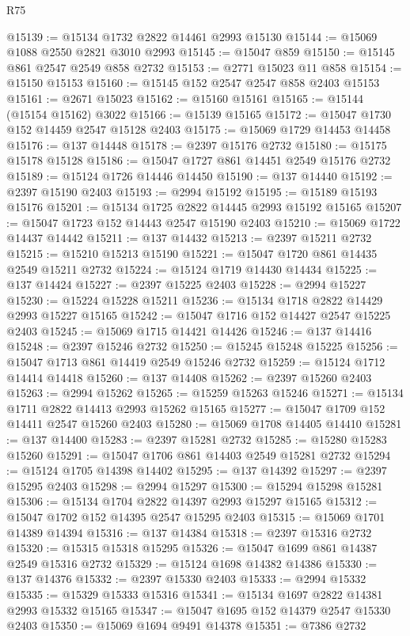 \begin{lexlean}{R75}
\begin{coremodule}
@15139 := @15134 @1732 @2822 @14461 @2993 @15130
@15144 := @15069 @1088 @2550 @2821 @3010 @2993
@15145 := @15047 @859
@15150 := @15145 @861 @2547 @2549 @858 @2732
@15153 := @2771 @15023 @11 @858
@15154 := @15150 @15153
@15160 := @15145 @152 @2547 @2547 @858 @2403 @15153
@15161 := @2671 @15023
@15162 := @15160 @15161
@15165 := @15144 (@15154 @15162) @3022
@15166 := @15139 @15165
@15172 := @15047 @1730 @152 @14459 @2547 @15128 @2403
@15175 := @15069 @1729 @14453 @14458
@15176 := @137 @14448
@15178 := @2397 @15176 @2732
@15180 := @15175 @15178 @15128
@15186 := @15047 @1727 @861 @14451 @2549 @15176 @2732
@15189 := @15124 @1726 @14446 @14450
@15190 := @137 @14440
@15192 := @2397 @15190 @2403
@15193 := @2994 @15192
@15195 := @15189 @15193 @15176
@15201 := @15134 @1725 @2822 @14445 @2993 @15192 @15165
@15207 := @15047 @1723 @152 @14443 @2547 @15190 @2403
@15210 := @15069 @1722 @14437 @14442
@15211 := @137 @14432
@15213 := @2397 @15211 @2732
@15215 := @15210 @15213 @15190
@15221 := @15047 @1720 @861 @14435 @2549 @15211 @2732
@15224 := @15124 @1719 @14430 @14434
@15225 := @137 @14424
@15227 := @2397 @15225 @2403
@15228 := @2994 @15227
@15230 := @15224 @15228 @15211
@15236 := @15134 @1718 @2822 @14429 @2993 @15227 @15165
@15242 := @15047 @1716 @152 @14427 @2547 @15225 @2403
@15245 := @15069 @1715 @14421 @14426
@15246 := @137 @14416
@15248 := @2397 @15246 @2732
@15250 := @15245 @15248 @15225
@15256 := @15047 @1713 @861 @14419 @2549 @15246 @2732
@15259 := @15124 @1712 @14414 @14418
@15260 := @137 @14408
@15262 := @2397 @15260 @2403
@15263 := @2994 @15262
@15265 := @15259 @15263 @15246
@15271 := @15134 @1711 @2822 @14413 @2993 @15262 @15165
@15277 := @15047 @1709 @152 @14411 @2547 @15260 @2403
@15280 := @15069 @1708 @14405 @14410
@15281 := @137 @14400
@15283 := @2397 @15281 @2732
@15285 := @15280 @15283 @15260
@15291 := @15047 @1706 @861 @14403 @2549 @15281 @2732
@15294 := @15124 @1705 @14398 @14402
@15295 := @137 @14392
@15297 := @2397 @15295 @2403
@15298 := @2994 @15297
@15300 := @15294 @15298 @15281
@15306 := @15134 @1704 @2822 @14397 @2993 @15297 @15165
@15312 := @15047 @1702 @152 @14395 @2547 @15295 @2403
@15315 := @15069 @1701 @14389 @14394
@15316 := @137 @14384
@15318 := @2397 @15316 @2732
@15320 := @15315 @15318 @15295
@15326 := @15047 @1699 @861 @14387 @2549 @15316 @2732
@15329 := @15124 @1698 @14382 @14386
@15330 := @137 @14376
@15332 := @2397 @15330 @2403
@15333 := @2994 @15332
@15335 := @15329 @15333 @15316
@15341 := @15134 @1697 @2822 @14381 @2993 @15332 @15165
@15347 := @15047 @1695 @152 @14379 @2547 @15330 @2403
@15350 := @15069 @1694 @9491 @14378
@15351 := @7386 @2732

\end{coremodule}
\end{lexlean}
